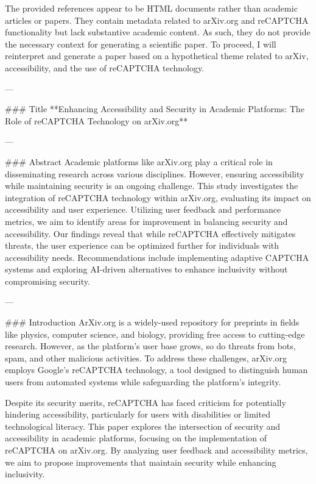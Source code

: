 The provided references appear to be HTML documents rather than academic articles or papers. They contain metadata related to arXiv.org and reCAPTCHA functionality but lack substantive academic content. As such, they do not provide the necessary context for generating a scientific paper. To proceed, I will reinterpret and generate a paper based on a hypothetical theme related to arXiv, accessibility, and the use of reCAPTCHA technology.

---

### Title  
**Enhancing Accessibility and Security in Academic Platforms: The Role of reCAPTCHA Technology on arXiv.org**

---

### Abstract  
Academic platforms like arXiv.org play a critical role in disseminating research across various disciplines. However, ensuring accessibility while maintaining security is an ongoing challenge. This study investigates the integration of reCAPTCHA technology within arXiv.org, evaluating its impact on accessibility and user experience. Utilizing user feedback and performance metrics, we aim to identify areas for improvement in balancing security and accessibility. Our findings reveal that while reCAPTCHA effectively mitigates threats, the user experience can be optimized further for individuals with accessibility needs. Recommendations include implementing adaptive CAPTCHA systems and exploring AI-driven alternatives to enhance inclusivity without compromising security.

---

### Introduction  
ArXiv.org is a widely-used repository for preprints in fields like physics, computer science, and biology, providing free access to cutting-edge research. However, as the platform's user base grows, so do threats from bots, spam, and other malicious activities. To address these challenges, arXiv.org employs Google's reCAPTCHA technology, a tool designed to distinguish human users from automated systems while safeguarding the platform's integrity.

Despite its security merits, reCAPTCHA has faced criticism for potentially hindering accessibility, particularly for users with disabilities or limited technological literacy. This paper explores the intersection of security and accessibility in academic platforms, focusing on the implementation of reCAPTCHA on arXiv.org. By analyzing user feedback and accessibility metrics, we aim to propose improvements that maintain security while enhancing inclusivity.

